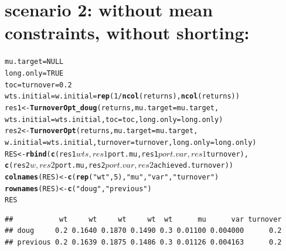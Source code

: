 \documentclass{uwstat518}\usepackage[]{graphicx}\usepackage[]{color}
\makeatletter
\newcommand{\hlstr}[1]{\textcolor[rgb]{0.192,0.494,0.8}{#1}}%
\newcommand{\hlkwd}[1]{\textcolor[rgb]{0.737,0.353,0.396}{\textbf{#1}}}%
\newenvironment{kframe}{%
 \def\at@end@of@kframe{}%
 \ifinner\ifhmode%
  \def\at@end@of@kframe{\end{minipage}}%
  \begin{minipage}{\columnwidth}%
 \fi\fi%
 \def\FrameCommand##1{\hskip\@totalleftmargin \hskip-\fboxsep
 \colorbox{shadecolor}{##1}\hskip-\fboxsep
     \hskip-\linewidth \hskip-\@totalleftmargin \hskip\columnwidth}%
 \MakeFramed {\advance\hsize-\width
   \@totalleftmargin\z@ \linewidth\hsize
   \@setminipage}}%
 {\par\unskip\endMakeFramed%
 \at@end@of@kframe}
\newenvironment{knitrout}{}{} %
\makeatother
\begin{document}
\section{scenario 2: without mean constraints, without shorting:}
\begin{knitrout}
\color{fgcolor}\begin{kframe}
\begin{alltt}
mu.target = NULL
long.only = TRUE
toc=turnover=0.2
wts.initial=w.initial=\hlkwd{rep}(1/\hlkwd{ncol}(returns),\hlkwd{ncol}(returns))
res1 <- \hlkwd{TurnoverOpt_doug}(returns, mu.target =mu.target, 
		wts.initial = wts.initial, toc = toc,long.only=long.only)
res2 <- \hlkwd{TurnoverOpt}(returns,mu.target=mu.target, 
		w.initial=wts.initial,turnover=turnover,long.only=long.only)
RES <- \hlkwd{rbind}(\hlkwd{c}(res1$wts,res1$port.mu,res1$port.var,res1$turnover), 
		\hlkwd{c}(res2$w,res2$port.mu, res2$port.var, res2$achieved.turnover))
\hlkwd{colnames}(RES) <- \hlkwd{c}(\hlkwd{rep}(\hlstr{"wt"},5),\hlstr{"mu"},\hlstr{"var"},\hlstr{"turnover"})
\hlkwd{rownames}(RES) <- \hlkwd{c}(\hlstr{"doug"},\hlstr{"previous"})
RES	
\end{alltt}
\begin{verbatim}
##           wt     wt     wt     wt  wt      mu      var turnover
## doug     0.2 0.1640 0.1870 0.1490 0.3 0.01100 0.004000      0.2
## previous 0.2 0.1639 0.1875 0.1486 0.3 0.01126 0.004163      0.2
\end{verbatim}
\end{kframe}
\end{knitrout}
\end{document}
